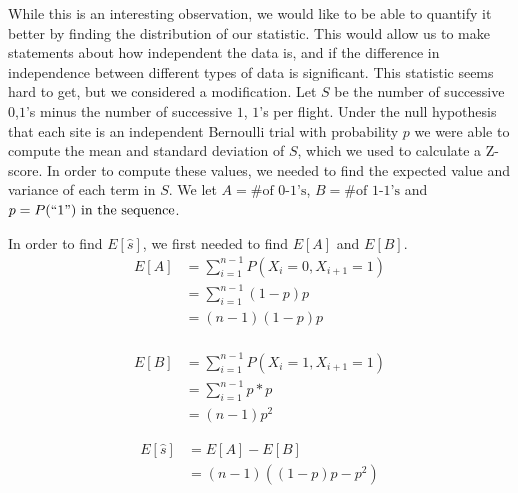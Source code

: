 \documentclass{article}
\begin{document}
	While this is an interesting observation, we would like to be able to 
quantify it better by finding the distribution of our statistic.  This would 
allow us to make statements about how independent the data is, and if the 
difference in independence between different types of data is significant.   
This statistic seems hard to get, but we considered a modification.  Let \(S\) 
be the number of successive \(0\),\(1\)'s minus the number of successive \(1\),
\(1\)'s per flight.  Under the null hypothesis that each site is an independent 
Bernoulli trial with probability \(p\) we were able to compute the mean and 
standard deviation of \(S\), which we used to calculate a Z-score.
	In order to compute these values, we needed to find the expected value and
variance of each term in \(S\).  We let \(A = \text{\# of 0-1's}\), 
\(B = \text{\# of 1-1's}\) and \(p = P(``1")\text{ in the sequence}\).

In order to find \(E[\hat{s}]\), we first needed to find \(E[A]\) and \(E[B]\).
    \begin{equation*}
        \begin{split}
        E[A]& =\sum_{i=1}^{n-1}P(X_i=0,X_{i+1}=1) \\
            & =\sum_{i=1}^{n-1}(1-p)p \\
            & =(n-1)(1-p)p \\
        \end{split}
    \end{equation*}

    \begin{equation*}
        \begin{split}
        E[B]& =\sum_{i=1}^{n-1}P(X_i=1,X_{i+1}=1) \\
            & =\sum_{i=1}^{n-1}p*p \\
            & =(n-1)p^2
        \end{split}
    \end{equation*}

    \begin{equation*}
        \begin{split}
        E[\hat{s}]& =E[A]-E[B] \\
                  & =(n-1)\left((1-p)p-p^2\right)
        \end{split}
    \end{equation*}
\end{document}

